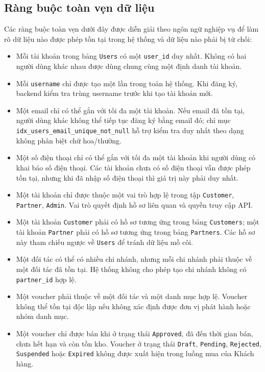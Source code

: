 \subsection{Ràng buộc toàn vẹn dữ liệu}

Các ràng buộc toàn vẹn dưới đây được diễn giải theo ngôn ngữ nghiệp vụ để làm rõ dữ liệu nào được phép tồn tại trong hệ thống và dữ liệu nào phải bị từ chối:

\begin{itemize}[leftmargin=1.2cm]
    \item Mỗi tài khoản trong bảng \texttt{Users} có một \texttt{user\_id} duy nhất. Không có hai người dùng khác nhau được dùng chung cùng một định danh tài khoản.
    \item Mỗi \texttt{username} chỉ được tạo một lần trong toàn hệ thống. Khi đăng ký, backend kiểm tra trùng username trước khi tạo tài khoản mới.
    \item Một email chỉ có thể gắn với tối đa một tài khoản. Nếu email đã tồn tại, người dùng khác không thể tiếp tục đăng ký bằng email đó; chỉ mục \texttt{idx\_users\_email\_unique\_not\_null} hỗ trợ kiểm tra duy nhất theo dạng không phân biệt chữ hoa/thường.
    \item Một số điện thoại chỉ có thể gắn với tối đa một tài khoản khi người dùng có khai báo số điện thoại. Các tài khoản chưa có số điện thoại vẫn được phép tồn tại, nhưng khi đã nhập số điện thoại thì giá trị này phải duy nhất.
    \item Một tài khoản chỉ được thuộc một vai trò hợp lệ trong tập \texttt{Customer}, \texttt{Partner}, \texttt{Admin}. Vai trò quyết định hồ sơ liên quan và quyền truy cập API.
    \item Một tài khoản \texttt{Customer} phải có hồ sơ tương ứng trong bảng \texttt{Customers}; một tài khoản \texttt{Partner} phải có hồ sơ tương ứng trong bảng \texttt{Partners}. Các hồ sơ này tham chiếu ngược về \texttt{Users} để tránh dữ liệu mồ côi.
    \item Một đối tác có thể có nhiều chi nhánh, nhưng mỗi chi nhánh phải thuộc về một đối tác đã tồn tại. Hệ thống không cho phép tạo chi nhánh không có \texttt{partner\_id} hợp lệ.
    \item Một voucher phải thuộc về một đối tác và một danh mục hợp lệ. Voucher không thể tồn tại độc lập nếu không xác định được đơn vị phát hành hoặc nhóm danh mục.
    \item Một voucher chỉ được bán khi ở trạng thái \texttt{Approved}, đã đến thời gian bán, chưa hết hạn và còn tồn kho. Voucher ở trạng thái \texttt{Draft}, \texttt{Pending}, \texttt{Rejected}, \texttt{Suspended} hoặc \texttt{Expired} không được xuất hiện trong luồng mua của Khách hàng.

\end{itemize}
